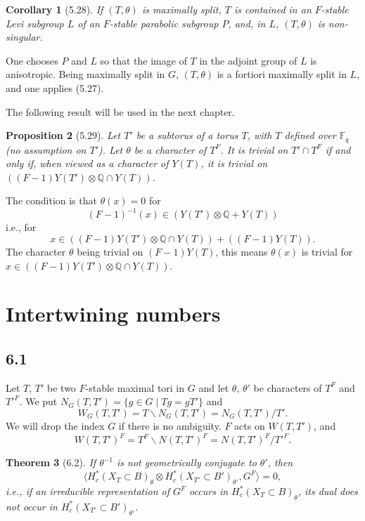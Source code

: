 \documentclass[11pt]{amsart}
\theoremstyle{plain}
\newtheorem{theorem}{Theorem}[section]
\newtheorem{proposition}[theorem]{Proposition}
\newtheorem{corollary}[theorem]{Corollary}
\theoremstyle{remark}
\begin{document}
\begin{corollary}[5.28]
If $(T, \theta)$ is maximally split, $T$ is contained in an $F$-stable Levi subgroup $L$ of an $F$-stable parabolic subgroup $P$, and, in $L$, $(T, \theta)$ is non-singular.
\end{corollary}

One chooses $P$ and $L$ so that the image of $T$ in the adjoint group of $L$ is anisotropic. Being maximally split in $G$, $(T, \theta)$ is a fortiori maximally split in $L$, and one applies (5.27).

The following result will be used in the next chapter.

\begin{proposition}[5.29]
Let $T'$ be a subtorus of a torus $T$, with $T$ defined over $\mathbb{F}_q$ (no assumption on $T'$). Let $\theta$ be a character of $T^F$. It is trivial on $T' \cap T^F$ if and only if, when viewed as a character of $Y(T)$, it is trivial on $((F - 1)Y(T') \otimes \mathbb{Q} \cap Y(T))$.
\end{proposition}

The condition is that $\theta(x) = 0$ for
\[
(F - 1)^{-1}(x) \in (Y(T') \otimes \mathbb{Q} + Y(T))
\]
i.e., for
\[
x \in ((F - 1)Y(T') \otimes \mathbb{Q} \cap Y(T)) + ((F - 1)Y(T)).
\]
The character $\theta$ being trivial on $(F - 1)Y(T)$, this means $\theta(x)$ is trivial for $x \in ((F - 1)Y(T') \otimes \mathbb{Q} \cap Y(T))$.

\section{Intertwining numbers}

\subsection{6.1} Let $T$, $T'$ be two $F$-stable maximal tori in $G$ and let $\theta$, $\theta'$ be characters of $T^F$ and $T'^F$. We put $N_G(T, T') = \{g \in G \mid Tg = gT'\}$ and
\[
W_G(T, T') = T\backslash N_G(T, T') = N_G(T, T')/T'.
\]
We will drop the index $G$ if there is no ambiguity. $F$ acts on $W(T, T')$, and
\[
W(T, T')^F = T^F\backslash N(T, T')^F = N(T, T')^F/T'^F.
\]

\begin{theorem}[6.2]
If $\theta^{-1}$ is not geometrically conjugate to $\theta'$, then
\[
\langle H_c^*(X_T \subset B)_\theta \otimes H_c^*(X_{T'} \subset B')_{\theta'}, G^F \rangle = 0,
\]
i.e., if an irreducible representation of $G^F$ occurs in $H_c^*(X_T \subset B)_\theta$, its dual does not occur in $H_c^*(X_{T'} \subset B')_{\theta'}$.
\end{theorem}
\end{document}
